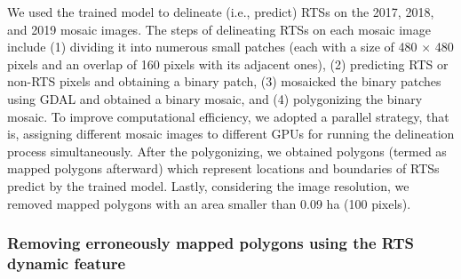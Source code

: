 \documentclass[authoryear,preprint,review,12pt]{elsarticle}
\begin{document}

We used the trained model to delineate (i.e., predict) RTSs on the 2017, 2018, and 2019 mosaic images. 
The steps of delineating RTSs on each mosaic image include
(1) dividing it into numerous small patches (each with a size of 480 $\times$ 480 pixels and an overlap of 160 pixels with its adjacent ones),
(2) predicting RTS or non-RTS pixels and obtaining a binary patch,
(3) mosaicked the binary patches using GDAL and obtained a binary mosaic, and %
(4) polygonizing the binary mosaic.  %
To improve computational efficiency, we adopted a parallel strategy, that is, assigning different mosaic images to different GPUs for running the delineation process simultaneously. 
After the polygonizing, we obtained polygons (termed as mapped polygons afterward) which represent locations and boundaries of RTSs predict by the trained model. 
Lastly, considering the image resolution, we removed mapped polygons with an area smaller than 0.09 ha (100 pixels). %

\subsubsection{Removing erroneously mapped polygons using the RTS dynamic feature}
\label{sec_improving_using_rts_dynamic}
\end{document}
